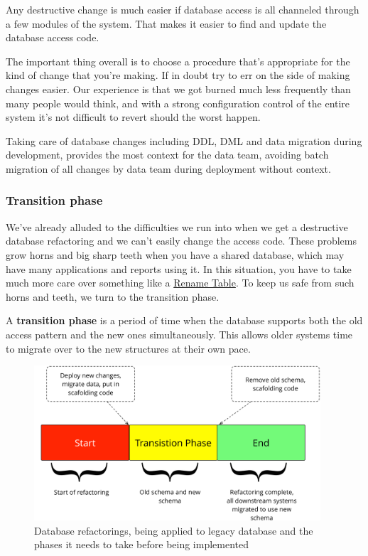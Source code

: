 \documentclass[12pt]{article}
\begin{document}
Any destructive change is much easier if database access is all
channeled through a few modules of the system. That makes it easier to
find and update the database access code.

The important thing overall is to choose a procedure that's appropriate
for the kind of change that you're making. If in doubt try to err on the
side of making changes easier. Our experience is that we got burned much
less frequently than many people would think, and with a strong
configuration control of the entire system it's not difficult to revert
should the worst happen.

Taking care of database changes including DDL, DML and data migration
during development, provides the most context for the data team,
avoiding batch migration of all changes by data team during deployment
without context.

\subsubsection{Transition phase}

We've already alluded to the difficulties we run into when we get a
destructive database refactoring and we can't easily change the access
code. These problems grow horns and big sharp teeth when you have a
shared database, which may have many applications and reports using it.
In this situation, you have to take much more care over something like a
\href{http://databaserefactoring.com/RenameTable.html}{Rename Table}. To
keep us safe from such horns and teeth, we turn to the transition phase.

A {\bfseries transition phase} is a period of time when the database
supports both the old access pattern and the new ones simultaneously.
This allows older systems time to migrate over to the new structures at
their own pace.

\begin{figure}[H]
  \begin{center}
    \includegraphics[width=0.95\textwidth]{stages_refactoring}
  \end{center}
  \caption{Database refactorings, being applied to legacy database and the phases it needs to take before being implemented}
  \label{fig:stages-refactoring}
\end{figure}
\end{document}
